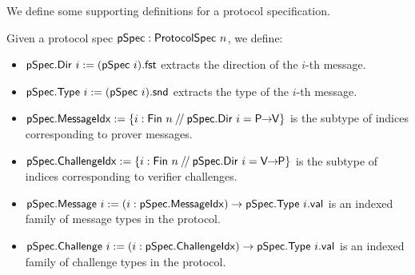 We define some supporting definitions for a protocol specification.

\begin{definition}
    \label{def:protocol_spec_components}
    Given a protocol spec \(\mathsf{pSpec} : \mathsf{ProtocolSpec}\ n\), we define:
    \begin{itemize}
        \item \(\pSpec.\Dir\ i := (\pSpec\ i).\mathsf{fst}\) extracts the direction of the \(i\)-th message.
        \item \(\pSpec.\Type\ i := (\pSpec\ i).\mathsf{snd}\) extracts the type of the \(i\)-th message.
        \item \(\mathsf{pSpec}.\mathsf{MessageIdx} := \{i : \mathsf{Fin}\ n \mathbin{/\!/} \mathsf{pSpec}.\mathsf{Dir}\ i = \mathsf{P \!\!\rightarrow\!\! V}\}\) is the subtype of indices corresponding to prover messages.
        \item \(\mathsf{pSpec}.\mathsf{ChallengeIdx} := \{i : \mathsf{Fin}\ n \mathbin{/\!/} \mathsf{pSpec}.\mathsf{Dir}\ i = \mathsf{V \!\!\rightarrow\!\! P}\}\) is the subtype of indices corresponding to verifier challenges.
        \item \(\mathsf{pSpec}.\mathsf{Message}\ i := (i : \mathsf{pSpec}.\mathsf{MessageIdx}) \to \mathsf{pSpec}.\mathsf{Type}\ i.\mathsf{val}\) is an indexed family of message types in the protocol.
        \item \(\mathsf{pSpec}.\mathsf{Challenge}\ i := (i : \mathsf{pSpec}.\mathsf{ChallengeIdx}) \to \mathsf{pSpec}.\mathsf{Type}\ i.\mathsf{val}\) is an indexed family of challenge types in the protocol.
    \end{itemize}
    \leanok
\end{definition}

